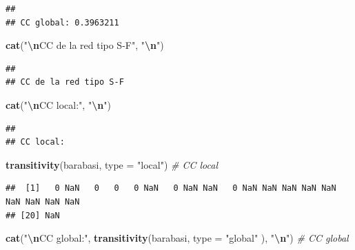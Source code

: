 \documentclass[
]{article}
\newenvironment{Shaded}{\begin{snugshade}}{\end{snugshade}}
\newcommand{\AttributeTok}[1]{\textcolor[rgb]{0.13,0.29,0.53}{#1}}
\newcommand{\CommentTok}[1]{\textcolor[rgb]{0.56,0.35,0.01}{\textit{#1}}}
\newcommand{\FunctionTok}[1]{\textcolor[rgb]{0.13,0.29,0.53}{\textbf{#1}}}
\newcommand{\NormalTok}[1]{#1}
\newcommand{\SpecialCharTok}[1]{\textcolor[rgb]{0.81,0.36,0.00}{\textbf{#1}}}
\newcommand{\StringTok}[1]{\textcolor[rgb]{0.31,0.60,0.02}{#1}}
\begin{document}
\begin{verbatim}
## 
## CC global: 0.3963211
\end{verbatim}

\begin{Shaded}
\begin{Highlighting}[]
\FunctionTok{cat}\NormalTok{(}\StringTok{"}\SpecialCharTok{\textbackslash{}n}\StringTok{CC de la red tipo S{-}F"}\NormalTok{, }\StringTok{"}\SpecialCharTok{\textbackslash{}n}\StringTok{"}\NormalTok{)}
\end{Highlighting}
\end{Shaded}

\begin{verbatim}
## 
## CC de la red tipo S-F
\end{verbatim}

\begin{Shaded}
\begin{Highlighting}[]
\FunctionTok{cat}\NormalTok{(}\StringTok{"}\SpecialCharTok{\textbackslash{}n}\StringTok{CC local:"}\NormalTok{, }\StringTok{"}\SpecialCharTok{\textbackslash{}n}\StringTok{"}\NormalTok{)}
\end{Highlighting}
\end{Shaded}

\begin{verbatim}
## 
## CC local:
\end{verbatim}

\begin{Shaded}
\begin{Highlighting}[]
\FunctionTok{transitivity}\NormalTok{(barabasi, }\AttributeTok{type =} \StringTok{"local"}\NormalTok{) }\CommentTok{\# CC local}
\end{Highlighting}
\end{Shaded}

\begin{verbatim}
##  [1]   0 NaN   0   0   0 NaN   0 NaN NaN   0 NaN NaN NaN NaN NaN NaN NaN NaN NaN
## [20] NaN
\end{verbatim}

\begin{Shaded}
\begin{Highlighting}[]
\FunctionTok{cat}\NormalTok{(}\StringTok{"}\SpecialCharTok{\textbackslash{}n}\StringTok{CC global:"}\NormalTok{, }\FunctionTok{transitivity}\NormalTok{(barabasi, }\AttributeTok{type =} \StringTok{"global"}\NormalTok{ ), }\StringTok{"}\SpecialCharTok{\textbackslash{}n}\StringTok{"}\NormalTok{) }\CommentTok{\# CC global}
\end{Highlighting}
\end{Shaded}
\end{document}
